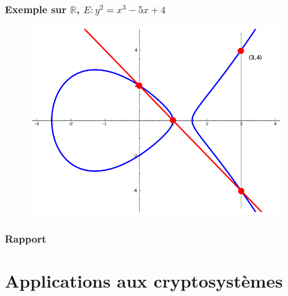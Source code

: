 \documentclass[9pt]{beamer}
\begin{document}
\begin{frame}
    \frametitle{Exemple sur $\mathbb{R}$, $E : y^2 = x^3 - 5x + 4$}
    \begin{figure}
        \includegraphics[scale=0.5]{ecc44.png}
    \end{figure}
\end{frame}

\begin{frame}
    \frametitle{Rapport}
\end{frame}

\section{Applications aux cryptosystèmes}
\end{document}

